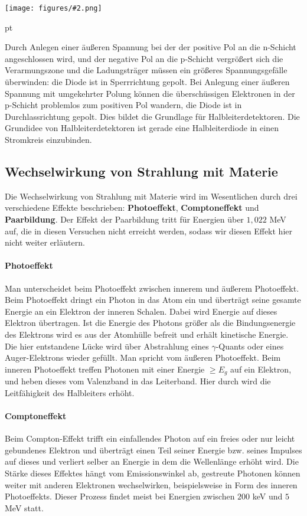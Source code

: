 \documentclass[12pt]{article}
\newcommand{\gra}[3][0.7]{
	\begin{minipage}[h!]{\textwidth}
		\centering
		\texttt{[image: figures/\#2.png]}
		\captionof{figure}{#3}
	\end{minipage}
	\vskip 30 pt
	}
\begin{document}
\gra{n-p-Diode}{Halbleiter-Diode} \cite{staat}

Durch Anlegen einer äußeren Spannung bei der der positive Pol an die n-Schicht angeschlossen wird, und der negative Pol an die p-Schicht vergrößert sich die Verarmungszone und die Ladungsträger müssen ein größeres Spannungsgefälle überwinden: die Diode ist in Sperrrichtung gepolt. Bei Anlegung einer äußeren Spannung mit umgekehrter Polung können die überschüssigen Elektronen in der p-Schicht problemlos zum positiven Pol wandern, die Diode ist in Durchlassrichtung gepolt.
Dies bildet die Grundlage für Halbleiterdetektoren. Die Grundidee von Halbleiterdetektoren ist gerade eine Halbleiterdiode in einen Stromkreis einzubinden.
\subsection{Wechselwirkung von Strahlung mit Materie \cite{anleitungkhwz}}

Die Wechselwirkung von Strahlung mit Materie wird im Wesentlichen durch drei verschiedene Effekte beschrieben: \textbf{Photoeffekt}, \textbf{Comptoneffekt} und \textbf{Paarbildung}.
Der Effekt der Paarbildung tritt für Energien über $1,022$ MeV auf, die in diesen Versuchen nicht erreicht werden, sodass wir diesen Effekt hier nicht weiter erläutern.

\paragraph{Photoeffekt} Man unterscheidet beim Photoeffekt zwischen innerem und äußerem Photoeffekt.
Beim Photoeffekt dringt ein Photon in das Atom ein und überträgt seine gesamte Energie an ein Elektron der inneren Schalen. Dabei wird Energie auf dieses Elektron übertragen. Ist die Energie des Photons größer als die Bindungsenergie des Elektrons wird es aus der Atomhülle befreit und erhält kinetische Energie. Die hier entstandene Lücke wird über Abstrahlung eines $\gamma$-Quants oder eines Auger-Elektrons wieder gefüllt. Man spricht vom äußeren Photoeffekt.
Beim inneren Photoeffekt treffen Photonen mit einer Energie  $\geq E_g$ auf ein Elektron, und heben dieses vom Valenzband in das Leiterband. Hier durch wird die Leitfähigkeit des Halbleiters erhöht.
\paragraph{Comptoneffekt} Beim Compton-Effekt trifft ein einfallendes Photon auf ein freies oder nur leicht gebundenes Elektron und überträgt einen Teil seiner Energie bzw. seines Impulses auf dieses und verliert selber an Energie in dem die Wellenlänge erhöht wird. Die Stärke dieses Effektes hängt vom Emissionswinkel ab, gestreute Photonen können weiter mit anderen Elektronen wechselwirken, beispielsweise in Form des inneren Photoeffekts. Dieser Prozess findet meist bei Energien zwischen $200$ keV und $5$ MeV statt.
\end{document}

